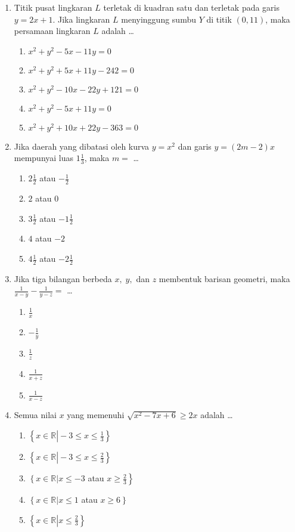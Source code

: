\documentclass[A4,12PT, english, twocolumn]{journal}
\begin{document}
\begin{enumerate}
\item Titik pusat lingkaran $L$ terletak di kuadran satu dan terletak pada garis $y=2x+1$. Jika lingkaran $L$ menyinggung sumbu $Y$ di titik $(0,11)$, maka persamaan lingkaran $L$ adalah \dots
    \begin{enumerate}
        \item $x^2+y^2-5x-11y=0$
        \item $x^2+y^2+5x+11y-242=0$
        \item $x^2+y^2-10x-22y+121=0$
        \item $x^2+y^2-5x+11y=0$
        \item $x^2+y^2+10x+22y-363=0$
    \end{enumerate}

\item Jika daerah yang dibatasi oleh kurva $y=x^2$ dan garis $y=(2m-2)x$ mempunyai luas $1\frac{1}{3}$, maka $m=$ \dots
    \begin{enumerate}
        \item $2\frac{1}{2}$ atau $-\frac{1}{2}$
        \item $2$ atau $0$
        \item $3\frac{1}{2}$ atau $-1\frac{1}{2}$
        \item $4$ atau $-2$
        \item $4\frac{1}{2}$ atau $-2\frac{1}{2}$
    \end{enumerate}

\item Jika tiga bilangan berbeda $x, \; y,$ dan $z$ membentuk barisan geometri, maka $\frac{1}{x-y}- \frac{1}{y-z}=$ \dots
    \begin{enumerate}
        \item $\frac{1}{x}$
        \item $-\frac{1}{y}$
        \item $\frac{1}{z}$
        \item $\frac{1}{x+z}$
        \item $\frac{1}{x-z}$
    \end{enumerate}

\item Semua nilai $x$ yang memenuhi $\sqrt{x^2-7x+6} \geq 2x$ adalah \dots
    \begin{enumerate}
        \item $\left\{ x \in \mathbb{R} \left|\right. -3 \leq x \leq \frac{1}{3} \right\}$
        \item $\left\{ x \in \mathbb{R} \left|\right. -3 \leq x \leq \frac{2}{3} \right\}$
        \item $\left\{ x \in \mathbb{R} \left|\right. x \leq -3 \right.$ atau $\left. x \geq \frac{2}{3} \right\}$
        \item $\left\{ x \in \mathbb{R} \left|\right. x \leq 1 \right.$ atau $\left. x \geq 6 \right\}$
        \item $\left\{ x \in \mathbb{R} \left|\right. x \leq \frac{2}{3} \right\}$
    \end{enumerate}


\end{enumerate}
\end{document}
